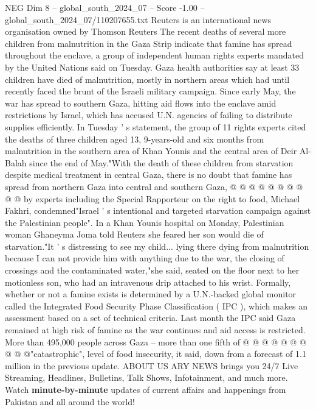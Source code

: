 \begin{textsample}{NEG Dim 8 – global\_south\_2024\_07 – Score -1.00 – global\_south\_2024\_07/110207655.txt}  \label{ex:f8_neg_112}
Reuters is an international news organisation owned by Thomson Reuters The recent deaths of several more children from malnutrition in the Gaza Strip indicate that famine has spread throughout the enclave, a group of independent human rights experts mandated by the United Nations said on Tuesday.
Gaza health authorities say at least 33 children have died of malnutrition, mostly in northern areas which had until recently faced the brunt of the Israeli military campaign.
Since early May, the war has spread to southern Gaza, hitting aid flows into the enclave amid restrictions by Israel, which has accused U.N. agencies of failing to distribute supplies efficiently.
In Tuesday ' s statement, the group of 11 rights experts cited the deaths of three children aged 13, 9-years-old and six months from malnutrition in the southern area of Khan Younis and the central area of Deir Al-Balah since the end of May."With the death of these children from starvation despite medical treatment in central Gaza, there is no doubt that famine has spread from northern Gaza into central and southern Gaza, @ @ @ @ @ @ @ @ @ @ by experts including the Special Rapporteur on the right to food, Michael Fakhri, condemned"Israel ' s intentional and targeted starvation campaign against the Palestinian people".
In a Khan Younis hospital on Monday, Palestinian woman Ghaneyma Joma told Reuters she feared her son would die of starvation."It ' s distressing to see my child... lying there dying from malnutrition because I can not provide him with anything due to the war, the closing of crossings and the contaminated water,"she said, seated on the floor next to her motionless son, who had an intravenous drip attached to his wrist.
Formally, whether or not a famine exists is determined by a U.N.-backed global monitor called the Integrated Food Security Phase Classification ( IPC ), which makes an assessment based on a set of technical criteria.
Last month the IPC said Gaza remained at high risk of famine as the war continues and aid access is restricted.
More than 495,000 people across Gaza -- more than one fifth of @ @ @ @ @ @ @ @ @ @"catastrophic", level of food insecurity, it said, down from a forecast of 1.1 million in the previous update.
ABOUT US ARY NEWS brings you 24/7 Live Streaming, Headlines, Bulletins, Talk Shows, Infotainment, and much more.
Watch \textbf{minute-by-minute} updates of current affairs and happenings from Pakistan and all around the world!

\end{textsample}
